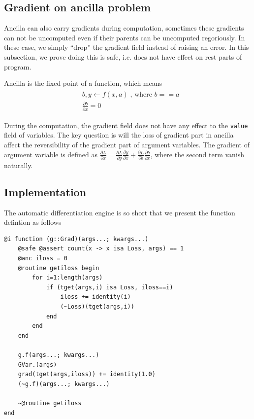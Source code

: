 \documentclass[aps,twocolumn,longbibliography,english,superscriptaddress,prr]{revtex4-1}
\newcommand{\<}{\langle}
\renewcommand{\>}{\rangle}
\theoremstyle{definition}\newtheorem{definition}{\textit{Definition}}
\begin{document}
\subsection{Gradient on ancilla problem}
Ancilla can also carry gradients during computation, sometimes these gradients can not be uncomputed even if their parents can be uncomputed regoriously. In these case, we simply ``drop'' the gradient field instead of raising an error. In this subsection, we prove doing this is safe, i.e. does not have effect on rest parts of program.

Ancilla is the fixed point of a function, which means 
\begin{align}
    \begin{split}
    &b, y \leftarrow f(x, a)\; \text{, where } b==a\\
    &\frac{\partial b}{\partial x} = 0
    \end{split}
\end{align}

During the computation, the gradient field does not have any effect to the \texttt{value} field of variables. The key question is will the loss of gradient part in ancilla affect the reversibility of the gradient part of argument variables.
The gradient of argument variable is defined as $\frac{\partial L}{\partial x} = \frac{\partial L}{\partial y}\frac{\partial y}{\partial x} + \frac{\partial L}{\partial b}\frac{\partial b}{\partial x}$, where the second term vanish naturally.

\subsection{Implementation}
The automatic differentiation engine is so short that we present the function defintion as follows

\begin{minipage}{.44\textwidth}
\begin{lstlisting}
@i function (g::Grad)(args...; kwargs...)
    @safe @assert count(x -> x isa Loss, args) == 1
    @anc iloss = 0
    @routine getiloss begin
        for i=1:length(args)
            if (tget(args,i) isa Loss, iloss==i)
                iloss += identity(i)
                (~Loss)(tget(args,i))
            end
        end
    end

    g.f(args...; kwargs...)
    GVar.(args)
    grad(tget(args,iloss)) += identity(1.0)
    (~g.f)(args...; kwargs...)

    ~@routine getiloss
end
\end{lstlisting}
\end{minipage}
\end{document}
